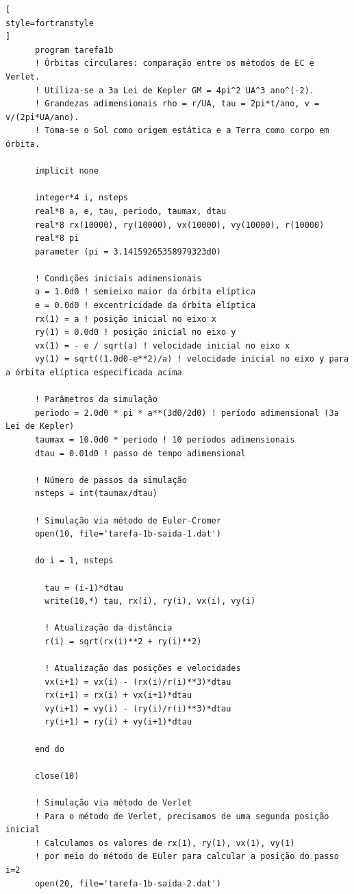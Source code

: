 \documentclass[12pt,a4paper]{article}
\begin{document}
\begin{lstlisting}[
style=fortranstyle
]
      program tarefa1b
      ! Órbitas circulares: comparação entre os métodos de EC e Verlet.
      ! Utiliza-se a 3a Lei de Kepler GM = 4pi^2 UA^3 ano^(-2).
      ! Grandezas adimensionais rho = r/UA, tau = 2pi*t/ano, v = v/(2pi*UA/ano).
      ! Toma-se o Sol como origem estática e a Terra como corpo em órbita.

      implicit none

      integer*4 i, nsteps
      real*8 a, e, tau, periodo, taumax, dtau
      real*8 rx(10000), ry(10000), vx(10000), vy(10000), r(10000)
      real*8 pi
      parameter (pi = 3.14159265358979323d0)

      ! Condições iniciais adimensionais
      a = 1.0d0 ! semieixo maior da órbita elíptica
      e = 0.0d0 ! excentricidade da órbita elíptica
      rx(1) = a ! posição inicial no eixo x
      ry(1) = 0.0d0 ! posição inicial no eixo y
      vx(1) = - e / sqrt(a) ! velocidade inicial no eixo x
      vy(1) = sqrt((1.0d0-e**2)/a) ! velocidade inicial no eixo y para a órbita elíptica especificada acima

      ! Parâmetros da simulação
      periodo = 2.0d0 * pi * a**(3d0/2d0) ! período adimensional (3a Lei de Kepler)
      taumax = 10.0d0 * periodo ! 10 períodos adimensionais
      dtau = 0.01d0 ! passo de tempo adimensional

      ! Número de passos da simulação
      nsteps = int(taumax/dtau)

      ! Simulação via método de Euler-Cromer
      open(10, file='tarefa-1b-saida-1.dat')

      do i = 1, nsteps

        tau = (i-1)*dtau
        write(10,*) tau, rx(i), ry(i), vx(i), vy(i)

        ! Atualização da distância
        r(i) = sqrt(rx(i)**2 + ry(i)**2)

        ! Atualização das posições e velocidades
        vx(i+1) = vx(i) - (rx(i)/r(i)**3)*dtau
        rx(i+1) = rx(i) + vx(i+1)*dtau
        vy(i+1) = vy(i) - (ry(i)/r(i)**3)*dtau
        ry(i+1) = ry(i) + vy(i+1)*dtau

      end do

      close(10)

      ! Simulação via método de Verlet
      ! Para o método de Verlet, precisamos de uma segunda posição inicial
      ! Calculamos os valores de rx(1), ry(1), vx(1), vy(1)
      ! por meio do método de Euler para calcular a posição do passo i=2
      open(20, file='tarefa-1b-saida-2.dat')


\end{lstlisting}
\end{document}
